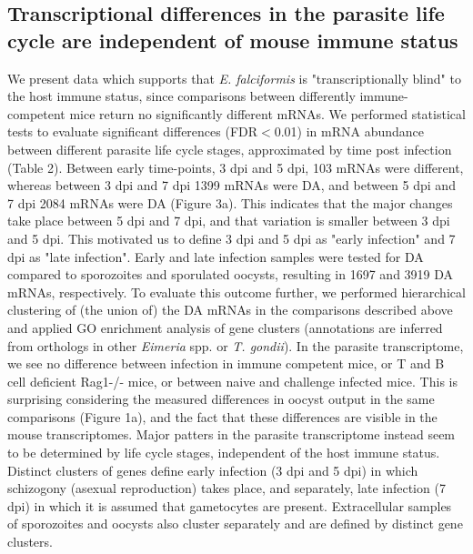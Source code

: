 \documentclass{bmcart}
\begin{document}
\subsection*{Transcriptional differences in the parasite life cycle are independent of mouse immune status}
We present data which supports that \textit{E. falciformis} is "transcriptionally blind" to the host immune status, since comparisons between differently immune-competent mice return no significantly different mRNAs. We performed statistical tests to evaluate significant differences (FDR$<$0.01) in mRNA abundance between different parasite life cycle stages, approximated by time post infection (Table 2). Between early time-points, 3 dpi and 5 dpi, 103 mRNAs were different, whereas between 3 dpi and 7 dpi 1399 mRNAs were DA, and between 5 dpi and 7 dpi 2084 mRNAs were DA (Figure 3a). This indicates that the major changes take place between 5 dpi and 7 dpi, and that variation is smaller between 3 dpi and 5 dpi. This motivated us to define 3 dpi and 5 dpi as "early infection" and 7 dpi as "late infection". Early and late infection samples were tested for DA compared to sporozoites and sporulated oocysts, resulting in 1697 and 3919 DA mRNAs, respectively.
To evaluate this outcome further, we performed hierarchical clustering of (the union of) the DA mRNAs in the comparisons described above and applied GO enrichment analysis of gene clusters (annotations are inferred from orthologs in other \textit{Eimeria} spp. or \textit{T. gondii}). In the parasite transcriptome, we see no difference between infection in immune competent mice, or T and B cell deficient Rag1-/- mice, or between naive and challenge infected mice. This is surprising considering the measured differences in oocyst output in the same comparisons (Figure 1a), and the fact that these differences are visible in the mouse transcriptomes. Major patters in the parasite transcriptome instead seem to be determined by life cycle stages, independent of the host immune status. Distinct clusters of genes define early infection (3 dpi and 5 dpi) in which schizogony (asexual reproduction) takes place, and separately, late infection (7 dpi) in which it is assumed that gametocytes are present. Extracellular samples of sporozoites and oocysts also cluster separately and are defined by distinct gene clusters. 
\end{document}
